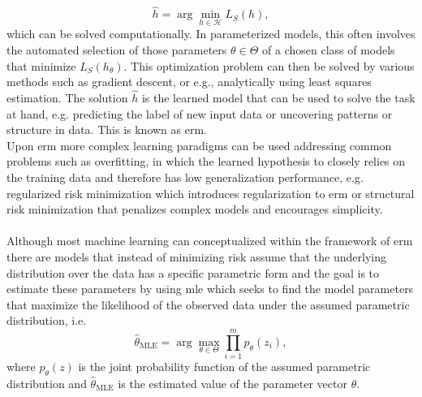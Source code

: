 \begin{tcolorbox}
\begin{equation}
    \hat{h}=\arg\min_{h\in\mathcal{H}}L_{S}(h),
    \end{equation}
    which can be solved computationally. In parameterized models, this often involves the automated selection of those parameters $\theta\in\Theta$  of a chosen class of models that minimize $L_{S}(h_\theta)$. This optimization problem can then be solved by various methods such as gradient descent,  or e.g., analytically using least squares estimation. The solution $\hat{h}$ is the learned model that can be used to solve the task at hand, e.g. predicting the label of new input data or uncovering patterns or structure in data. This is known as \gls{erm}.\\
    Upon \gls{erm} more complex learning paradigms can be used addressing common problems such as overfitting, in which the learned hypothesis to closely relies on the training data and therefore has low generalization performance, e.g. regularized risk minimization which introduces regularization to \gls{erm} or structural risk minimization that penalizes complex models and encourages simplicity.\\
    \\
    Although most machine learning can conceptualized within the framework of \gls{erm} there are models that instead of minimizing risk assume that the underlying distribution over the data has a specific parametric form and the goal is to estimate these parameters by using \gls{mle} which seeks to find the model parameters that maximize the likelihood of the observed data under the assumed parametric distribution, i.e. \\
    \begin{equation}
    \hat{\theta}_{\text{MLE}} = \arg\max_{\theta\in\Theta}\prod_{i=1}^{m}p_{\theta}(z_i),
    \end{equation}
    where $p_{\theta}(z)$ is the joint probability function of the assumed parametric distribution and $\hat{\theta}_{\text{MLE}}$ is the estimated value of the parameter vector $\theta$.
\end{tcolorbox}

